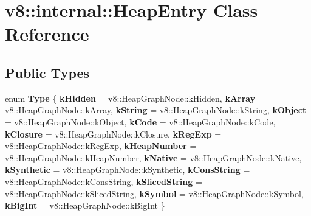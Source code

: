 \hypertarget{classv8_1_1internal_1_1HeapEntry}{}\section{v8\+:\+:internal\+:\+:Heap\+Entry Class Reference}
\label{classv8_1_1internal_1_1HeapEntry}
\subsection*{Public Types}
\begin{DoxyCompactItemize}
\item 
\mbox{\label{classv8_1_1internal_1_1HeapEntry_a6e70aae1c0794dd9783cb91e01b0a6c1}} 
enum {\bfseries Type} \{ \newline
{\bfseries k\+Hidden} = v8\+:\+:Heap\+Graph\+Node\+:\+:k\+Hidden, 
{\bfseries k\+Array} = v8\+:\+:Heap\+Graph\+Node\+:\+:k\+Array, 
{\bfseries k\+String} = v8\+:\+:Heap\+Graph\+Node\+:\+:k\+String, 
{\bfseries k\+Object} = v8\+:\+:Heap\+Graph\+Node\+:\+:k\+Object, 
\newline
{\bfseries k\+Code} = v8\+:\+:Heap\+Graph\+Node\+:\+:k\+Code, 
{\bfseries k\+Closure} = v8\+:\+:Heap\+Graph\+Node\+:\+:k\+Closure, 
{\bfseries k\+Reg\+Exp} = v8\+:\+:Heap\+Graph\+Node\+:\+:k\+Reg\+Exp, 
{\bfseries k\+Heap\+Number} = v8\+:\+:Heap\+Graph\+Node\+:\+:k\+Heap\+Number, 
\newline
{\bfseries k\+Native} = v8\+:\+:Heap\+Graph\+Node\+:\+:k\+Native, 
{\bfseries k\+Synthetic} = v8\+:\+:Heap\+Graph\+Node\+:\+:k\+Synthetic, 
{\bfseries k\+Cons\+String} = v8\+:\+:Heap\+Graph\+Node\+:\+:k\+Cons\+String, 
{\bfseries k\+Sliced\+String} = v8\+:\+:Heap\+Graph\+Node\+:\+:k\+Sliced\+String, 
\newline
{\bfseries k\+Symbol} = v8\+:\+:Heap\+Graph\+Node\+:\+:k\+Symbol, 
{\bfseries k\+Big\+Int} = v8\+:\+:Heap\+Graph\+Node\+:\+:k\+Big\+Int
 \}
\end{DoxyCompactItemize}
